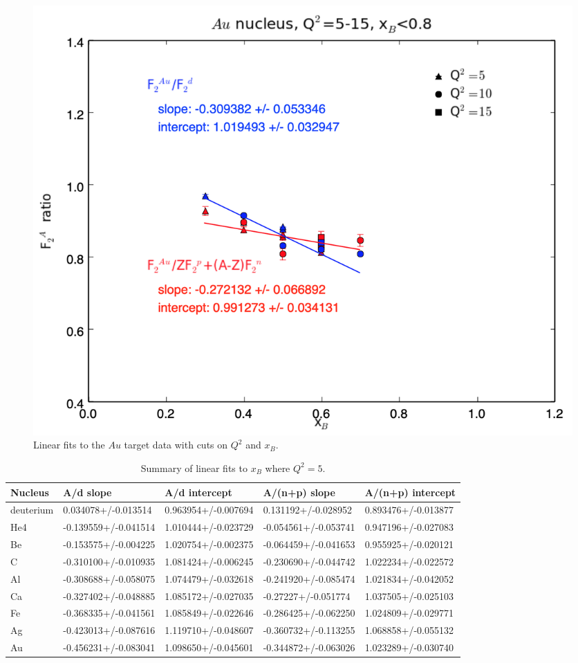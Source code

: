 \documentclass[oneside]{article}
\begin{document}
\begin{figure}
\begin{minipage}{0.5\textwidth}
\includegraphics[width=\textwidth]{plots/q2_all_x_all/all_Au.png}
\end{minipage}
  \caption[]{Linear fits to the $Au$ target data with cuts on $Q^2$ and $x_B$.}
  \label{fig:fits_Au}
\end{figure}   

\begin{table}[htb!]
\caption{\label{SlopeFits} Summary of linear fits to $x_B$ where $Q^2=5$.}
\centering
\begin{tabular}{ | C{2.5cm} | C{2cm} | C{2cm} | C{2cm} | C{2cm} | }
 \hline
 \textbf{Nucleus} & \textbf{A/d slope} & \textbf{A/d intercept} & \textbf{A/(n+p) slope} & \textbf{A/(n+p) intercept} \\ 
  \hline
deuterium & 0.034078+/-0.013514	& 0.963954+/-0.007694 & 0.131192+/-0.028952 &	0.893476+/-0.013877 \\ 
  \hline
  He4 & -0.139559+/-0.041514	 & 1.010444+/-0.023729 & -0.054561+/-0.053741 & 0.947196+/-0.027083 \\ 
 \hline
 Be & -0.153575+/-0.004225	 &1.020754+/-0.002375 &-0.064459+/-0.041653&	0.955925+/-0.020121\\ 
  \hline
   C & -0.310100+/-0.010935	& 1.081424+/-0.006245 & -0.230690+/-0.044742	&1.022234+/-0.022572  \\ 
  \hline
    Al &-0.308688+/-0.058075 &	1.074479+/-0.032618 & -0.241920+/-0.085474 &	1.021834+/-0.042052 \\ 
  \hline
 Ca &-0.327402+/-0.048885 &	1.085172+/-0.027035 & -0.27227+/-0.051774 &	1.037505+/-0.025103 \\ 
  \hline  
  Fe & -0.368335+/-0.041561&	1.085849+/-0.022646& -0.286425+/-0.062250 &	1.024809+/-0.029771 \\ 
  \hline 
  Ag & -0.423013+/-0.087616 &	1.119710+/-0.048607 & -0.360732+/-0.113255	& 1.068858+/-0.055132 \\ 
  \hline 
   Au & -0.456231+/-0.083041	&1.098650+/-0.045601 & -0.344872+/-0.063026 &	1.023289+/-0.030740\\ 
  \hline 
    \end{tabular}
\end{table} 
\end{document}
